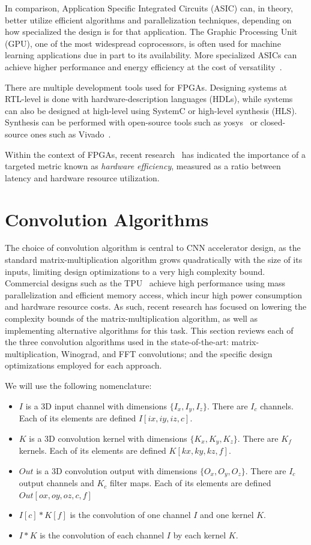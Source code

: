 In comparison, Application Specific Integrated Circuits (ASIC) can, in theory, better utilize efficient algorithms and parallelization techniques, depending on how specialized the design is for that application. The Graphic Processing Unit (GPU), one of the most widespread coprocessors, is often used for machine learning applications due in part to its availability. More specialized ASICs can achieve higher performance and energy efficiency at the cost of versatility~\cite{hu2022survey}.

There are multiple development tools used for FPGAs. Designing systems at RTL-level is done with hardware-description languages (HDLs), while systems can also be designed at high-level using SystemC or high-level synthesis (HLS). Synthesis can be performed with open-source tools such as yosys~\cite{wolf2013yosys} or closed-source ones such as Vivado~\cite{feist2012vivado}.

Within the context of FPGAs, recent research~\cite{li2022hardware} has indicated the importance of a targeted metric known as \textit{hardware efficiency}, measured as a ratio between latency and hardware resource utilization.

\section{Convolution Algorithms}

The choice of convolution algorithm is central to CNN accelerator design, as the standard matrix-multiplication algorithm grows quadratically with the size of its inputs, limiting design optimizations to a very high complexity bound. Commercial designs such as the TPU~\cite{jouppi2020domain} achieve high performance using mass parallelization and efficient memory access, which incur high power consumption and hardware resource costs. As such, recent research has focused on lowering the complexity bounds of the matrix-multiplication algorithm, as well as implementing alternative algorithms for this task. This section reviews each of the three convolution algorithms used in the state-of-the-art: matrix-multiplication, Winograd, and FFT convolutions; and the specific design optimizations employed for each approach.

We will use the following nomenclature:
\begin{itemize}
  \item $I$ is a 3D input channel with dimensions $\{I_x,I_y,I_z\}$. There are $I_c$ channels. Each of its elements are defined $I[ix, iy, iz, c]$.
  \item $K$ is a 3D convolution kernel with dimensions $\{K_x,K_y,K_z\}$. There are $K_f$ kernels. Each of its elements are defined $K[kx, ky, kz, f]$.
  \item $Out$ is a 3D convolution output with dimensions $\{O_x,O_y,O_z\}$. There are $I_c$ output channels and $K_c$ filter maps. Each of its elements are defined $Out[ox, oy, oz, c, f]$
  \item $I[c]*K[f]$ is the convolution of one channel $I$ and one kernel $K$.
  \item $I*K$ is the convolution of each channel $I$ by each kernel $K$.
\end{itemize}

